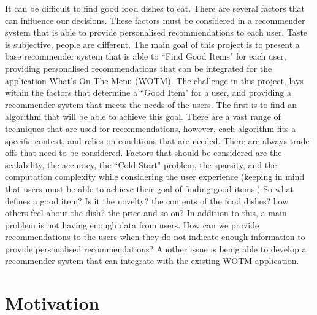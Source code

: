 It can be difficult to find good food dishes to eat. There are several factors that can influence our decisions. These factors must be considered in a recommender system that is able to provide personalised recommendations to each user. Taste is subjective, people are different.  The main goal of this project is to present a base recommender system that is able to ``Find Good Items" for each user, providing personalised recommendations that can be integrated for the application What's On The Menu (WOTM). The challenge in this project, lays within the factors that determine a ``Good Item" for a user, and providing a recommender system that meets the needs of the users. The first is to find an algorithm that will be able to achieve this goal. There are a vast range of techniques that are used for recommendations, however, each algorithm fits a specific context, and relies on conditions that are needed. There are always trade-offs that need to be considered. Factors that should be considered are the scalability, the accuracy, the ``Cold Start" problem, the sparsity, and the computation complexity while considering the user experience (keeping in mind that users must be able to achieve their goal of finding good items.) So what defines a good item? Is it the novelty? the contents of the food dishes? how others feel about the dish? the price and so on? In addition to this, a main problem is not having enough data from users. How can we provide recommendations to the users when they do not indicate enough information to provide personalised recommendations? Another issue is being able to develop a recommender system that can integrate with the existing WOTM application. 

\section{Motivation}


